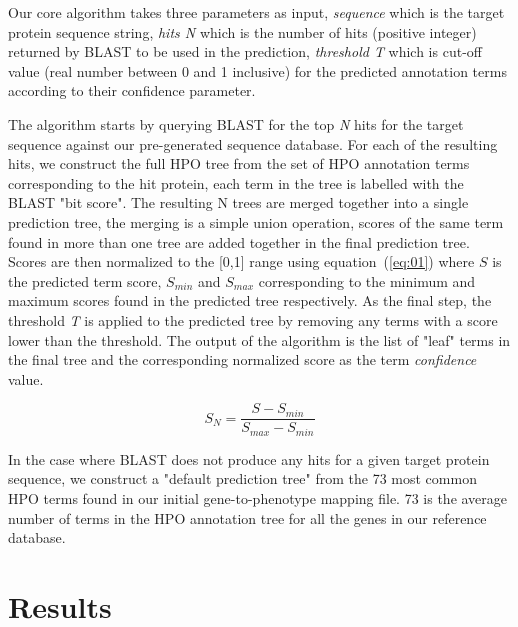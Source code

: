 \documentclass{bioinfo}
\begin{document}
Our core algorithm takes three parameters as input, \textit{sequence} which is the target protein sequence string, \textit{hits N} which is the number of hits (positive integer) returned by BLAST to be used in the prediction, \textit{threshold T} which is cut-off value (real number between 0 and 1 inclusive) for the predicted annotation terms according to their confidence parameter.

The algorithm starts by querying BLAST for the top \textit{N} hits for the target sequence against our pre-generated sequence database. For each of the resulting hits, we construct the full HPO tree from the set of HPO annotation terms corresponding to the hit protein, each term in the tree is labelled with the BLAST "bit score". The resulting N trees are merged together into a single prediction tree, the merging is a simple union operation, scores of the same term found in more than one tree are added together in the final prediction tree. Scores are then normalized to the [0,1] range using equation~(\ref{eq:01}) where $S$ is the predicted term score, $S_{min}$ and $S_{max}$ corresponding to the minimum and maximum scores found in the predicted tree respectively. As the final step, the threshold \textit{T} is applied to the predicted tree by removing any terms with a score lower than the threshold. The output of the algorithm is the list of "leaf" terms in the final tree and the corresponding normalized score as the term \textit{confidence} value.

\begin{equation}
S_N = \frac{S - S_{min}}{S_{max} - S_{min}}
\label{eq:01}
\end{equation}

In the case where BLAST does not produce any hits for a given target protein sequence, we construct a "default prediction tree" from the 73 most common HPO terms found in our initial gene-to-phenotype mapping file. 73 is the average number of terms in the HPO annotation tree for all the genes in our reference database.

\section{Results}
\end{document}
